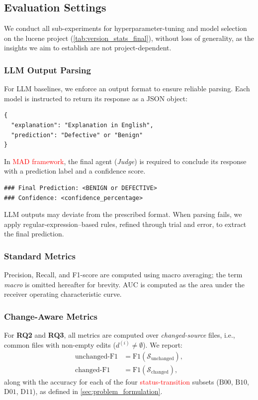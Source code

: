 \documentclass[authoryear,final,5p,times,twocolumn]{elsarticle}
\theoremstyle{plain}
\begin{document}

\subsection{Evaluation Settings}
\label{sec:res}
We conduct all sub-experiments for hyperparameter-tuning and model selection on the lucene project (\autoref{tab:version_stats_final}), without loss of generality, as the insights we aim to establish are not project-dependent.
\subsubsection{LLM Output Parsing}

For LLM baselines, we enforce an output format to ensure reliable parsing. Each model is instructed to return its response as a JSON object:
{\small
\begin{verbatim}
{
  "explanation": "Explanation in English",
  "prediction": "Defective" or "Benign"
}
\end{verbatim}
}

In \textcolor{red}{MAD framework}, the final agent (\emph{Judge}) is required to conclude its response with a prediction label and a confidence score.

{\small
\begin{verbatim}
### Final Prediction: <BENIGN or DEFECTIVE>
### Confidence: <confidence_percentage>
\end{verbatim}
}

LLM outputs may deviate from the prescribed format. When parsing fails, we apply regular-expression–based rules, refined through trial and error, to extract the final prediction.

\subsubsection{Standard Metrics}
Precision, Recall, and F1-score are computed using macro averaging; the term \emph{macro} is omitted hereafter for brevity. AUC is computed as the area under the receiver operating characteristic curve.

\subsubsection{Change-Aware Metrics}
For \textbf{RQ2} and \textbf{RQ3}, all metrics are computed over \emph{changed-source} files, i.e., common files with non-empty edits (\(d^{(i)} \neq \emptyset\)). We report:
\begin{align}
\text{unchanged-F1} &= \mathrm{F1}(\mathcal{S}_{\text{unchanged}}), \\
\text{changed-F1}   &= \mathrm{F1}(\mathcal{S}_{\text{changed}}),
\end{align}
along with the accuracy for each of the four \textcolor{red}{status-transition} subsets (\(\mathrm{B00}\), \(\mathrm{B10}\), \(\mathrm{D01}\), \(\mathrm{D11}\)), as defined in \autoref{sec:problem_formulation}. 
\end{document}
